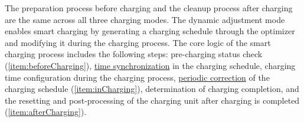 \documentclass[
	english,
	ruledheaders=section,%
	class=report,%
	thesis={type=Report},%
	accentcolor=9c,%
	custommargins=true,%
	marginpar=false,%
	parskip=half-,%
	fontsize=11pt,%
	logofile={img/tuda_logo.pdf}, %
]{tudapub}
\begin{document}
The preparation process before charging and the cleanup process after charging are the same across all three charging modes. The dynamic adjustment mode enables smart charging by generating a charging schedule through the optimizer and modifying it during the charging process. The core logic of the smart charging process includes the following steps: pre-charging status check (\autoref{item:beforeCharging}),  \hyperref[subsec: timeSynchronAndSplit]{time synchronization} in the charging schedule, charging time configuration during the charging process, \hyperref[subsec: chargePlanCorrection]{periodic correction} of the charging schedule (\autoref{item:inCharging}), determination of charging completion, and the resetting and post-processing of the charging unit after charging is completed (\autoref{item:afterCharging}).
\end{document}
